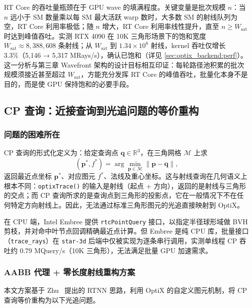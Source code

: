RT Core 的吞吐量瓶颈在于 GPU wave 的填满程度。关键变量是批次规模 $n$：当 $n$ 远小于 SM 数量乘以每 SM 最大活跃 warp 数时，大多数 SM 的射线队列为空，RT Core 利用率极低；随 $n$ 增大，RT Core 利用率线性提升，直至 $n \ge W_{\text{sat}}$ 时达到峰值吞吐。实测 RTX 4090 在 10K 三角形场景下的饱和宽度 $W_{\text{sat}} \approx 8{,}388{,}608$ 条射线；从 $W_{\text{sat}}$ 到 $1.34 \times 10^8$ 射线，kernel 吞吐仅增长 3.3\%（5,146 → 5,317 MRays/s），确认已饱和（详见 \ref{sec:optix_backend:perf}）。这一分析与第三章 Wavefront 架构的设计目标相互印证：每轮路径池积累的批次规模须接近甚至超过 $W_{\text{sat}}$，方能充分发挥 RT Core 的峰值吞吐，批量化本身不是目的，而是使 GPU 保持饱和的必要手段。

\subsection{CP 查询：近接查询到光追问题的等价重构}
\label{sec:optix_backend:cp_mapping}

\subsubsection{问题的困难所在}

CP 查询的形式化定义为：给定查询点 $\mathbf{q} \in \mathbb{R}^3$，在三角网格 $\mathcal{M}$ 上求
\begin{equation}
  (\mathbf{p}^*, f^*) = \arg\min_{\mathbf{p} \in \mathcal{M}} \|\mathbf{p} - \mathbf{q}\|,
\end{equation}
返回最近点坐标 $\mathbf{p}^*$、对应图元 $f^*$、法线及重心坐标。这与射线查询在几何语义上根本不同：\texttt{optixTrace()} 的输入是射线（起点 + 方向），返回的是射线与三角形的交点；而 CP 查询所求的是查询点到三角形的投影点，它在一般情况下不在任何特定方向射线上。因此，无法通过标准三角形图元的光追直接映射到 OptiX。

在 CPU 端，Intel Embree 提供 \texttt{rtcPointQuery} 接口，以指定半径球形域做 BVH 剪枝，并对命中叶节点回调精确最近点计算。但 Embree 是纯 CPU 库，批量接口（\texttt{trace\_rays}）在 \texttt{star-3d} 后端中仅被实现为逐条串行调用，实测单线程 CP 吞吐约 0.79 MQuery/s（10K 三角形），无法满足批量 GPU 加速需求。

\subsubsection{AABB 代理 + 零长度射线重构方案}

本文方案基于 Zhu~\cite{zhuRTNNAcceleratingNeighbor2022} 提出的 RTNN 思路，利用 OptiX 的自定义图元机制，将 CP 查询等价重构为以下光追问题。

